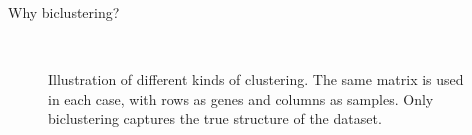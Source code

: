 \documentclass[final]{beamer}
\newlength{\onecolwid}
\begin{document}
\begin{frame}[t]
\begin{columns}[t]
\begin{column}{\onecolwid}
\begin{block}{Why biclustering?}
\begin{figure}
\begin{minipage}{1\linewidth}
    \centering
{}
\end{minipage}
\\
\begin{minipage}{1\linewidth}
    \centering
{}
\end{minipage}
\caption{Illustration of different kinds of clustering. The same matrix is used in each case, with rows as genes and columns as samples. Only biclustering captures the true structure of the dataset.}
\label{fig:caption}
    \end{figure}


\end{block}
\end{column}
\end{columns}
\end{frame}
\end{document}
